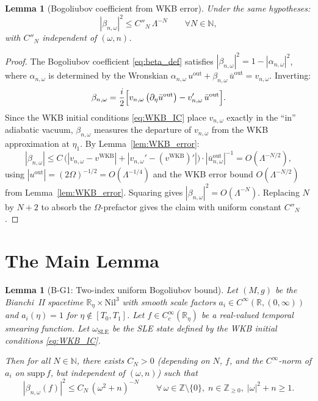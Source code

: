 \documentclass[11pt, a4paper]{article}
\newtheorem{lemma}[theorem]{Lemma}
\newcommand{\RR}{\mathbb{R}}
\newcommand{\ZZ}{\mathbb{Z}}
\newcommand{\NN}{\mathbb{N}}
\newcommand{\Nil}{\mathrm{Nil}^3}
\newcommand{\om}{\omega}
\newcommand{\Lam}{\Lambda}
\begin{document}
\begin{lemma}[Bogoliubov coefficient from WKB error]\label{lem:beta_from_WKB}
  Under the same hypotheses:
  \begin{equation}\label{eq:beta_WKB}
    |\beta_{n,\om}|^2 \leq C''_N\,\Lam^{-N}
    \qquad \forall N \in \NN,
  \end{equation}
  with $C''_N$ independent of $(\om, n)$.
\end{lemma}

\begin{proof}
  The Bogoliubov coefficient \eqref{eq:beta_def} satisfies
  $|\beta_{n,\om}|^2 = 1 - |\alpha_{n,\om}|^2$,
  where $\alpha_{n,\om}$ is determined by the Wronskian
  $\alpha_{n,\om}\,u^{\mathrm{out}} + \beta_{n,\om}\,\bar{u}^{\mathrm{out}} = v_{n,\om}$.
  Inverting:
  \begin{equation}
    \beta_{n,\om} = \frac{i}{2}\Bigl[
      v_{n,\om}\,\bigl(\partial_\eta\bar{u}^{\mathrm{out}}\bigr)
      - v_{n,\om}'\,\bar{u}^{\mathrm{out}}
    \Bigr].
  \end{equation}
  Since the WKB initial conditions \eqref{eq:WKB_IC} place $v_{n,\om}$
  exactly in the ``in'' adiabatic vacuum, $\beta_{n,\om}$
  measures the departure of $v_{n,\om}$ from the WKB approximation at $\eta_1$.
  By Lemma~\ref{lem:WKB_error}:
  \begin{equation}
    |\beta_{n,\om}|
    \leq C\,\bigl(|v_{n,\om} - v^{\mathrm{WKB}}| + |v_{n,\om}' - (v^{\mathrm{WKB}})'|\bigr)
    \cdot |\bar{u}^{\mathrm{out}}_{n,\om}|^{-1}
    = O(\Lam^{-N/2}),
  \end{equation}
  using $|u^{\mathrm{out}}| = (2\Omega)^{-1/2} = O(\Lam^{-1/4})$ and
  the WKB error bound $O(\Lam^{-N/2})$ from Lemma~\ref{lem:WKB_error}.
  Squaring gives $|\beta_{n,\om}|^2 = O(\Lam^{-N})$.
  Replacing $N$ by $N+2$ to absorb the $\Omega$-prefactor gives
  the claim with uniform constant $C''_N$.
\end{proof}

\section{The Main Lemma}

\begin{lemma}[B-G1: Two-index uniform Bogoliubov bound]\label{lem:BG1}
  Let $(M, g)$ be the Bianchi~II spacetime $\RR_\eta \times \Nil$ with
  smooth scale factors $a_i \in C^\infty(\RR, (0,\infty))$
  and $a_i(\eta) = 1$ for $\eta \notin [T_0, T_1]$.
  Let $f \in C_c^\infty(\RR_\eta)$ be a real-valued temporal smearing function.
  Let $\omega_{\mathrm{SLE}}$ be the SLE state defined by the WKB
  initial conditions \eqref{eq:WKB_IC}.

  Then for all $N \in \NN$, there exists $C_N > 0$
  (depending on $N$, $f$, and the $C^\infty$-norm of $a_i$
  on $\mathrm{supp}\,f$, but independent of $(\om, n)$) such that
  \begin{equation}\label{eq:BG1}
    \boxed{|\beta_{n,\om}(f)|^2 \leq C_N\,(\om^2 + n)^{-N}}
    \qquad
    \forall\, \om \in \ZZ \setminus \{0\},\; n \in \ZZ_{\geq 0},\;
    |\om|^2 + n \geq 1.
  \end{equation}
\end{lemma}
\end{document}
